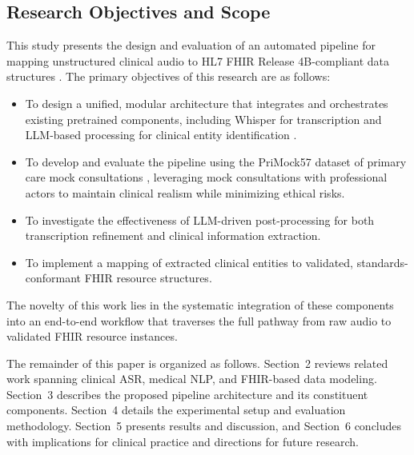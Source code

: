 \subsection{Research Objectives and Scope}

This study presents the design and evaluation of an automated pipeline for mapping unstructured clinical audio to HL7 FHIR Release 4B-compliant data structures \cite{hl7fhir2022r4b}. The primary objectives of this research are as follows:

\begin{itemize}
    \item To design a unified, modular architecture that integrates and orchestrates existing pretrained components, including Whisper \cite{radford2023whisper} for transcription and LLM-based processing for clinical entity identification \cite{adedeji2024sound}.
    \item To develop and evaluate the pipeline using the PriMock57 dataset of primary care mock consultations \cite{papadopoulos2022primock57}, leveraging mock consultations with professional actors to maintain clinical realism while minimizing ethical risks.
    \item To investigate the effectiveness of LLM-driven post-processing for both transcription refinement and clinical information extraction.
    \item To implement a mapping of extracted clinical entities to validated, standards-conformant FHIR resource structures.
\end{itemize}

The novelty of this work lies in the systematic integration of these components into an end-to-end workflow that traverses the full pathway from raw audio to validated FHIR resource instances.

The remainder of this paper is organized as follows. Section~2 reviews related work spanning clinical ASR, medical NLP, and FHIR-based data modeling. Section~3 describes the proposed pipeline architecture and its constituent components. Section~4 details the experimental setup and evaluation methodology. Section~5 presents results and discussion, and Section~6 concludes with implications for clinical practice and directions for future research.
